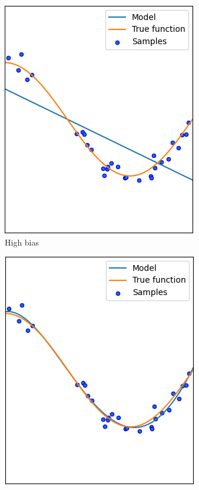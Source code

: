 \begin{figure}[H]
    \centering
    \begin{subfigure}{0.32\textwidth}
        \centering
        \includegraphics[width=0.75\linewidth]{images/hb.png} 
        \caption{High bias}
    \end{subfigure}
    \begin{subfigure}{0.32\textwidth}
        \centering
        \includegraphics[width=0.75\linewidth]{images/b.png} 

\end{subfigure}
\end{figure}
